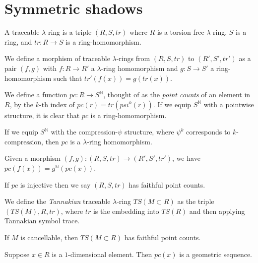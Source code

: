 
\section{Symmetric shadows}

\begin{definition}
  A traceable $\lambda$-ring is a triple $(R, S, tr)$ where $R$ is a torsion-free $\lambda$-ring, $S$ is a ring, and $tr: R \to S$ is a ring-homomorphism.  
\end{definition}

\begin{definition}
  We define a morphism of traceable $\lambda$-rings from $(R, S, tr)$ to $(R', S', tr')$ as a pair $(f, g)$ with $f : R \to R'$ a $\lambda$-ring homomorphism and $g : S \to S'$ a ring-homomorphism such that $tr'(f(x)) = g(tr(x))$.
\end{definition}

\begin{definition}
  We define a function $pc : R \to S^{\mathbb{N}}$, thought of as the \emph{point counts} of an element in $R$, by the $k$-th index of $pc(r) = tr(psi^k(r))$. If we equip $S^{\mathbb{N}}$ with a pointwise structure, it is clear that $pc$ is a ring-homomorphism. 
\end{definition}

\begin{proposition}
  If we equip $S^{\mathbb{N}}$ with the compression-$\psi$ structure, where $\psi^k$ corresponds to $k$-compression, then $pc$ is a $\lambda$-ring homomorphism.
\end{proposition}

\begin{proposition}
  Given a morphism $(f, g) : (R, S, tr) \to (R', S', tr')$, we have $pc(f(x)) = g^{\mathbb{N}}(pc(x))$.
\end{proposition}

\begin{definition}
  If $pc$ is injective then we say $(R, S, tr)$ has faithful point counts. 
\end{definition}

\begin{definition}
  We define the \emph{Tannakian} traceable $\lambda$-ring $TS(M \subset R)$ as the triple $(TS(M), R, tr)$, where $tr$ is the embedding into $TS(R)$ and then applying Tannakian symbol trace. 
\end{definition}

\begin{proposition}
  If $M$ is cancellable, then $TS(M \subset R)$ has faithful point counts. 
\end{proposition}


\begin{proposition}
  Suppose $x \in R$ is a $1$-dimensional element. Then $pc(x)$ is a geometric sequence.
\end{proposition}
